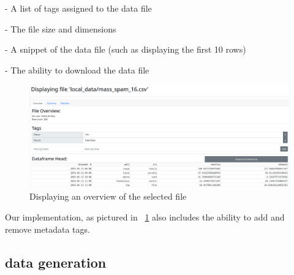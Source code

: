 - A list of tags assigned to the data file

- The file size and dimensions

- A snippet of the data file (such as displaying the first 10 rows)

- The ability to download the data file

\begin{figure}[h]
    \centering
    \includegraphics[width=12cm]{figures/website_images/catalogue_page_file_overview}
    \caption{Displaying an overview of the selected file}\label{fig:catalogue_file_overview}
\end{figure}

Our implementation, as pictured in ~\ref{fig:catalogue_file_overview} also includes the ability to add and remove
metadata tags.

\subsection{data generation}\label{subsec:data-generation}
